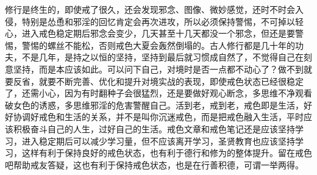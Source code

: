 \begin{case}
    修行是终生的，即使戒了很久，还会发现邪念、图像、微妙感觉，还时不时会入侵，特别是怂恿和邪淫的回忆肯定会再次进攻，所以必须保持警惕，不可掉以轻心，进入戒色稳定期后邪念会变少，几天甚至十几天都没一个邪念，但还是要警惕，警惕的螺丝不能松，否则戒色大夏会轰然倒塌的。古人修行都是几十年的功夫，不是几年，是持之以恒的坚持，坚持到最后就习惯成自然了，不觉得自己在刻意坚持，而是本应该如此。可以问下自己，对境时是否一点都不动心了？做不到就要反省，就要不断完善、优化和提升对境实战的表现，即使戒色状态已经很稳定了，还需小心，因为有时翻种子会很猛烈，还是要做好观心断念，多思维不净观看破女色的诱惑，多思维邪淫的危害警醒自己。活到老，戒到老，戒色即是生活，好好协调好戒色和生活的关系，并不是叫你沉迷戒色，而是把戒色融入生活，平时应该积极奋斗自己的人生，过好自己的生活。戒色文章和戒色笔记还是应该坚持学习，进入稳定期后可以减少学习量，但不应该离开学习，圣贤教育也应该坚持学习，这样有利于保持良好的戒色状态，也有利于德行和修为的整体提升。留在戒色吧帮助戒友答疑，这也有利于保持戒色状态，也是在行善积德，可谓一举两得。
\end{case}

